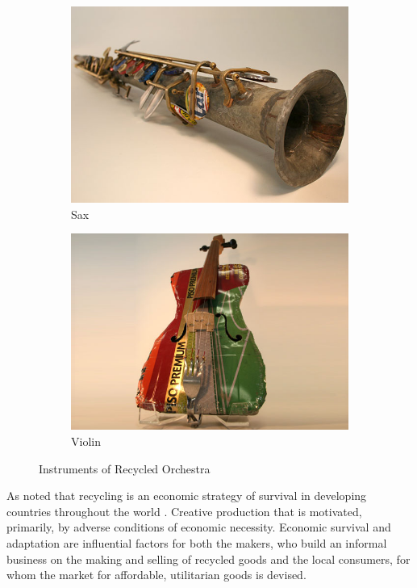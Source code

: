 \begin{figure}
  \begin{subfigure}[b]{0.48\textwidth}
    \includegraphics[width=\textwidth]{graphics/landfill_harmonic-sax.jpg}
    \caption{Sax}
    \label{fig:landfill_harmonic-sax}
  \end{subfigure}
  \hfill
  \begin{subfigure}[b]{0.48\textwidth}
    \includegraphics[width=\textwidth]{graphics/landfill_harmonic-violin.jpg}
    \caption{Violin}
    \label{fig:landfill_harmonic-violin}
  \end{subfigure}
  \caption{Instruments of Recycled Orchestra}\label{fig:animals}
\end{figure}

As noted that recycling is an economic strategy of survival in developing countries throughout the world \citep[25]{cerny1996recycled}. Creative production that is motivated, primarily, by adverse conditions of economic necessity. Economic survival and adaptation are influential factors for both the makers, who build an informal business on the making and selling of recycled goods and the local consumers, for whom the market for affordable, utilitarian goods is devised. 

